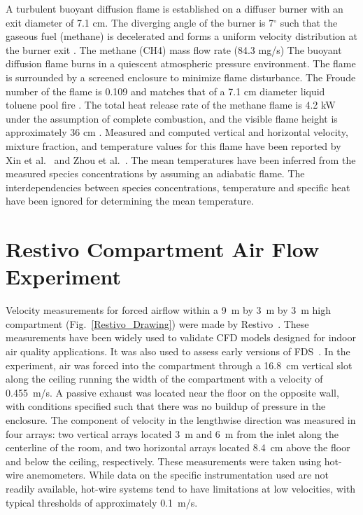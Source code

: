 A turbulent buoyant diffusion flame is established on a diffuser burner with an exit diameter of 7.1 cm. The diverging angle of the burner is 7$^\circ$ such that the gaseous fuel (methane) is decelerated and forms a uniform velocity distribution at the burner exit \cite{Xin:CF2005}. The methane (CH4) mass flow rate (84.3 mg/s) The buoyant diffusion flame burns in a quiescent atmospheric pressure environment. The flame is surrounded by a screened enclosure to minimize flame disturbance. The Froude number of the flame is 0.109 and matches that of a 7.1 cm diameter liquid toluene pool fire \cite{Xin:CF2005,Zhou:CS1998}. The total heat release rate of the methane flame is 4.2 kW under the assumption of complete combustion, and the visible flame height is approximately 36 cm \cite{Xin:CF2005}. Measured and computed vertical and horizontal velocity, mixture fraction, and temperature values for this flame have been reported by Xin et al.~\cite{Xin:CF2005,Xin:PhD2002} and Zhou et al.~\cite{Zhou:CS1998,Zhou:PurduePhD1999}. The mean temperatures have been inferred from the measured species concentrations \cite{Xin:CF2005} by assuming an adiabatic flame. The interdependencies between species concentrations, temperature and specific heat have been ignored for determining the mean temperature.

\section{Restivo Compartment Air Flow Experiment}

Velocity measurements for forced airflow within a 9~m by 3~m by 3~m high compartment (Fig.~\ref{Restivo_Drawing}) were made by Restivo~\cite{Restivo:1979}. These measurements have been widely used to validate CFD models designed for indoor air quality applications. It was also used to assess early versions of FDS~\cite{Emmerich:1,Emmerich:2,Musser:1}. In the experiment, air was forced into the compartment through a 16.8~cm vertical slot along the ceiling running the width of the compartment with a velocity of 0.455~m/s. A passive exhaust was located near the floor on the opposite wall, with conditions specified such that there was no buildup of pressure in the enclosure. The component of velocity in the lengthwise direction was measured in four arrays: two vertical arrays located 3~m and 6~m  from the inlet along the
centerline of the room, and two horizontal arrays located 8.4~cm above the floor and below the ceiling, respectively. These measurements were taken using hot-wire anemometers. While data on the specific instrumentation used are not readily available, hot-wire systems tend to have limitations at low velocities, with typical thresholds of approximately 0.1~m/s.

